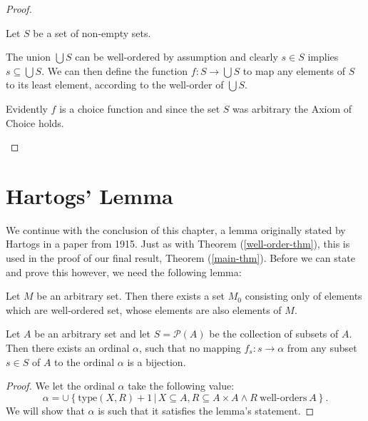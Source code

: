 \documentclass[../../main.tex]{subfiles}
\begin{document}
\begin{proof}
\begin{enumerate}
        Let $S$ be a set of non-empty sets.

        The union $\bigcup S$ can be well-ordered by assumption and clearly $s \in S$ implies $s \subseteq \bigcup S$.
        We can then define the function $f: S \to \bigcup S$ to map any elements of $S$ to its least element, according to the well-order of $\bigcup S$.
        
        Evidently $f$ is a choice function and since the set $S$ was arbitrary the Axiom of Choice holds. \qedhere
    \end{enumerate}
\end{proof}

\section{Hartogs' Lemma}
We continue with the conclusion of this chapter, a lemma originally stated by Hartogs in a paper from 1915. %
Just as with Theorem (\ref{well-order-thm}), this is used in the proof of our final result, Theorem (\ref{main-thm}).
Before we can state and prove this however, we need the following lemma:

\begin{lemma}\cite[Annex]{Har15}
    Let $M$ be an arbitrary set.
    Then there exists a set $M_0$ consisting only of elements which are well-ordered set, whose elements are also elements of $M$.
\end{lemma}

\begin{lemma}\cite{Har15}
    Let $A$ be an arbitrary set and let $S = \mathcal{P}(A)$ be the collection of subsets of $A$.
    Then there exists an ordinal $\alpha$, such that no mapping $f_s: s \to \alpha$ from any subset $s \in S$ of $A$ to the ordinal $\alpha$ is a bijection.
\end{lemma}

\begin{proof}\cite[Lemma]{Haj72}
    We let the ordinal $\alpha$ take the following value:
    $$\alpha = \cup\left\{ \text{type}\left(X, R\right) + 1 \,\vert\, X \subseteq A, R \subseteq A \times A \wedge R\ \text{well-orders}\ A\right\}.$$
    We will show that $\alpha$ is such that it satisfies the lemma's statement.

\end{proof}
\end{document}
